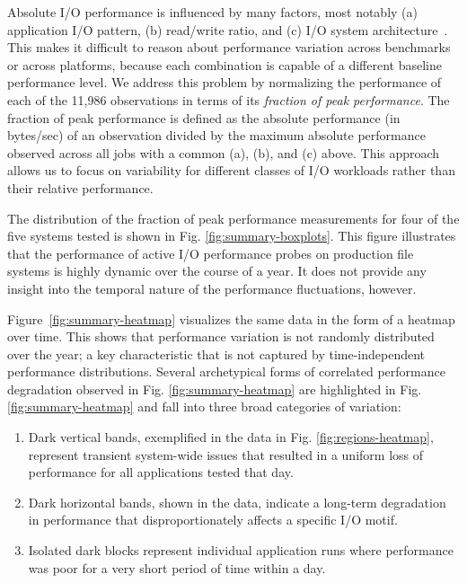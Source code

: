Absolute I/O performance is influenced by many factors, most notably (a)
application I/O pattern, (b) read/write ratio, and (c) I/O system
architecture~\cite{Lockwood2017, Xie2012}.  This makes it difficult to
reason about performance variation across benchmarks or across platforms,
because each combination is capable of a different baseline performance
level.  We
address this problem by normalizing the
performance of each of the 11,986 observations in terms of its
\emph{fraction of peak performance}.
The fraction of peak performance is defined as the absolute performance (in
bytes/sec) of an observation divided by the maximum absolute performance
observed across all jobs with a common (a), (b), and (c) above.  This
approach allows us to focus on variability for different classes of I/O
workloads rather than their relative performance.

The distribution of the fraction of peak performance measurements for four
of the five systems tested is shown in Fig. \ref{fig:summary-boxplots}.
This figure illustrates that the performance of active I/O performance
probes on production file systems is highly dynamic over the course of a
year.  It does not provide any insight into the temporal nature of the
performance fluctuations, however.

Figure~\ref{fig:summary-heatmap} visualizes the same data in the form of a
heatmap over time.  This shows that performance variation is not randomly
distributed over the year; a key characteristic that is not captured by
time-independent performance distributions.
Several archetypical forms of correlated performance degradation observed in Fig. \ref{fig:summary-heatmap} are highlighted in Fig. \ref{fig:summary-heatmap} and fall into three broad categories of variation:

\begin{enumerate}[leftmargin=*]
\item Dark vertical bands, exemplified in the \mira data in Fig. \ref{fig:regions-heatmap}, represent transient system-wide issues that resulted in a uniform loss of performance for all applications tested that day.
\item Dark horizontal bands, shown in the \cori data, indicate a long-term degradation in performance that disproportionately affects a specific I/O motif.
\item Isolated dark blocks represent individual application runs where performance was poor for a very short period of time within a day.
\end{enumerate}

